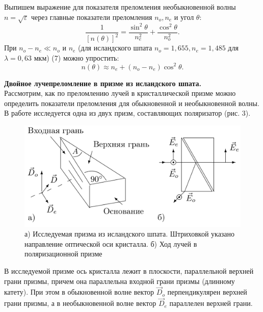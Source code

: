 \documentclass[a4paper, 12pt]{article}%
\begin{document}
	Выпишем выражение для показателя преломления необыкновенной волны $n = \sqrt \varepsilon$ через главные показатели преломления $n_o, n_e$ и угол $\theta$:
	\begin{equation}
		\frac{1}{\left[ n(\theta) \right] ^ 2} = \frac{\sin^2 \theta}{n^2_e} + \frac{\cos^2 \theta}{n^2_o}.
	\end{equation}
	При $n_o - n_e \ll n_o$ и $n_e$ (для исландского шпата $n_o = 1,655, n_e = 1,485$ для $\lambda = 0,63$ мкм) (7) можно упростить:
	\begin{equation}
		n(\theta) \approx n_e + (n_o - n_e) \cos^2 \theta.
	\end{equation}
	
	\noindent \textbf{Двойное лучепреломление в призме из исландского шпата.}\\ Рассмотрим, как по преломлению лучей в кристаллической призме можно определить показатели преломления для обыкновенной и необыкновенной волны. В работе исследуется одна из двух призм, составляющих поляризатор (рис. 3).

	\begin{figure}[H]
		\begin{center}
		\includegraphics[width = 0.5\linewidth]{shpat.png}
		\caption{ а) Исследуемая призма из исландского шпата. Штриховкой указано направление оптической оси кристалла. б) Ход лучей в поляризационной призме}
	\end{center}
	\end{figure}	
	В исследуемой призме ось кристалла лежит в плоскости, параллельной верхней грани призмы, причем она параллельна входной грани призмы (длинному катету). При этом в обыкновенной волне вектор $\vec D_o$ перпендикулярен верхней грани призмы, а в необыкновенной волне вектор $\vec D_e$  параллелен верхней грани.
	
\end{document}
